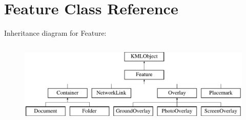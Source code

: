\hypertarget{classFeature}{
\section{Feature Class Reference}
\label{d5/d74/classFeature}
}
Inheritance diagram for Feature:\begin{figure}[H]
\begin{center}
\leavevmode
\includegraphics[height=4.000000cm]{d5/d74/classFeature}
\end{center}
\end{figure}
